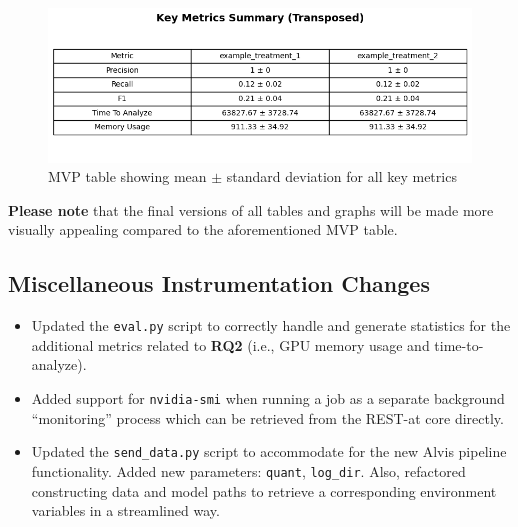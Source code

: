 \documentclass[conference]{IEEEtran}
\begin{document}
\begin{figure}[ht]
    \centering
    \includegraphics[width=1\linewidth]{images/MVP table example.png}
    \caption{MVP table showing mean $\pm$ standard deviation for all key metrics}
    \label{MVP-table}
\end{figure}

\textbf{Please note} that the final versions of all tables and graphs will be made more visually appealing compared to the aforementioned MVP table.




\subsection{Miscellaneous Instrumentation Changes}
\begin{itemize}
    \item Updated the \verb|eval.py| script to correctly handle and generate statistics for the additional metrics related to \textbf{RQ2} (i.e., GPU memory usage and time-to-analyze).
    \item Added support for \verb|nvidia-smi| when running a job as a separate background ``monitoring'' process which can be retrieved from the REST-at core directly.
    \item Updated the \verb|send_data.py| script to accommodate for the new Alvis pipeline functionality. Added new parameters: \verb|quant|, \verb|log_dir|. Also, refactored constructing data and model paths to retrieve a corresponding environment variables in a streamlined way.
\end{itemize}
\end{document}
